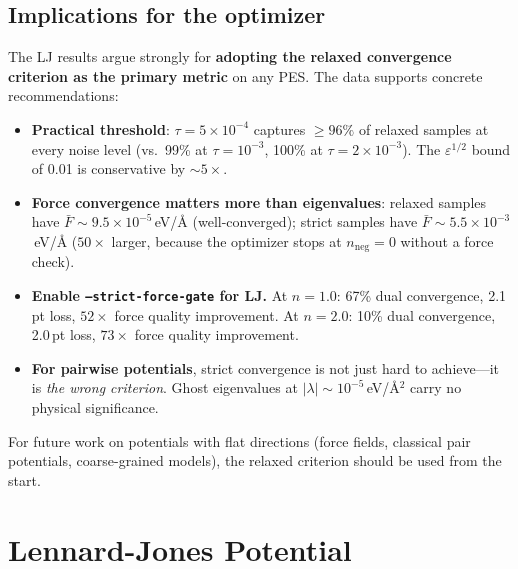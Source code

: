 \documentclass[11pt,a4paper]{article}
\theoremstyle{definition}
\begin{document}
\subsection{Implications for the optimizer}

The LJ results argue strongly for \textbf{adopting the relaxed convergence
criterion as the primary metric} on any PES.  The data supports concrete
recommendations:

\begin{itemize}[nosep]
  \item \textbf{Practical threshold}: $\tau = 5 \times 10^{-4}$ captures
    ${\geq}96\%$ of relaxed samples at every noise level (vs.\ 99\% at
    $\tau = 10^{-3}$, 100\% at $\tau = 2 \times 10^{-3}$).  The
    $\varepsilon^{1/2}$ bound of 0.01 is conservative by ${\sim}5\times$.
  \item \textbf{Force convergence matters more than eigenvalues}: relaxed
    samples have $\bar{F} \sim 9.5 \times 10^{-5}$\,eV/\AA{} (well-converged);
    strict samples have $\bar{F} \sim 5.5 \times 10^{-3}$\,eV/\AA{}
    ($50\times$ larger, because the optimizer stops at $n_\text{neg}{=}0$
    without a force check).
  \item \textbf{Enable \texttt{--strict-force-gate} for LJ.}
    At $n{=}1.0$: 67\% dual convergence, 2.1\,pt loss, $52\times$ force
    quality improvement.  At $n{=}2.0$: 10\% dual convergence, 2.0\,pt
    loss, $73\times$ force quality improvement.
  \item \textbf{For pairwise potentials}, strict convergence is not just
    hard to achieve---it is \emph{the wrong criterion}.  Ghost eigenvalues
    at $|\lambda| \sim 10^{-5}$\,eV/\AA$^2$ carry no physical significance.
\end{itemize}

For future work on potentials with flat directions (force fields, classical
pair potentials, coarse-grained models), the relaxed criterion should be
used from the start.

%
%
\clearpage
\appendix

\section{Lennard-Jones Potential}
\label{app:lj-potential}
\end{document}
